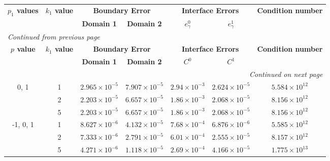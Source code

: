 \begin{table}[!htbp]
    \centering
    \begin{longtable}{ccccccc}
        \toprule
        \multicolumn{1}{c}{\textbf{\(p_1\) values}} & \multicolumn{1}{c}{\textbf{\(k_1\) value}} & \multicolumn{2}{c}{\textbf{Boundary Error}} & \multicolumn{2}{c}{\textbf{Interface Errors}} & \multicolumn{1}{c}{\textbf{Condition number}} \\
        \cmidrule(lr){2-2} \cmidrule(lr){3-4} \cmidrule(lr){5-6} \cmidrule(lr){7-7}
        & & \textbf{Domain 1} & \textbf{Domain 2} & \textbf{\(e_\gamma^0\)} & \textbf{\(e_\gamma^1\)} & \\
        \midrule
        \endfirsthead %
        \multicolumn{7}{l}{{\footnotesize\emph{Continued from previous page}}} \\
        \toprule
        \multicolumn{1}{c}{\textbf{\(p\) value}} & \multicolumn{1}{c}{\textbf{\(k_1\) value}} & \multicolumn{2}{c}{\textbf{Boundary Error}} & \multicolumn{2}{c}{\textbf{Interface Errors}} & \multicolumn{1}{c}{\textbf{Condition number}} \\
        \cmidrule(lr){2-2} \cmidrule(lr){3-4} \cmidrule(lr){5-6} \cmidrule(lr){7-7}
        & & \textbf{Domain 1} & \textbf{Domain 2} & \textbf{\(C^0\)} & \textbf{\(C^1\)} & \\
        \midrule
        \endhead %
        \midrule[\heavyrulewidth] %
        \multicolumn{7}{r}{{\footnotesize\emph{Continued on next page}}} \\
        \endfoot %
        \bottomrule
        \endlastfoot %
        
        0, 1 & 1 & $2.965\times10^{-5}$ & $7.907\times10^{-5}$ & $2.94\times10^{-3}$ & $2.624\times10^{-5}$ & $5.584\times10^{12}$ \\
        & 2 & $2.203\times10^{-5}$ & $6.657\times10^{-5}$ & $1.86\times10^{-3}$ & $2.068\times10^{-5}$ & $8.156\times10^{12}$ \\
        & 5 & $2.203\times10^{-5}$ & $6.657\times10^{-5}$ & $1.86\times10^{-3}$ & $2.068\times10^{-5}$ & $8.156\times10^{12}$ \\
        \midrule[\heavyrulewidth] %
        
        -1, 0, 1 & 1 & $8.627\times10^{-6}$ & $4.132\times10^{-5}$ & $7.68\times10^{-4}$ & $6.876\times10^{-6}$ & $5.585\times10^{12}$ \\
        & 2 & $7.333\times10^{-6}$ & $2.791\times10^{-5}$ & $6.01\times10^{-4}$ & $2.555\times10^{-5}$ & $8.157\times10^{12}$ \\
        & 5 & $4.271\times10^{-6}$ & $1.118\times10^{-5}$ & $2.69\times10^{-4}$ & $4.166\times10^{-5}$ & $1.775\times10^{13}$ \\
        \midrule[\heavyrulewidth] %


\end{longtable}
\end{table}
